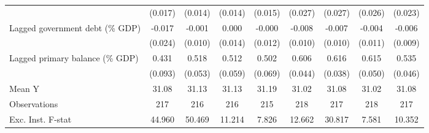 {\begin{tabular}{l*{8}{c}}
                    &     (0.017)         &     (0.014)         &     (0.014)         &     (0.015)         &     (0.027)         &     (0.027)         &     (0.026)         &     (0.023)         \\
\addlinespace
Lagged government debt (\% GDP)&      -0.017         &      -0.001         &       0.000         &      -0.000         &      -0.008         &      -0.007         &      -0.004         &      -0.006         \\
                    &     (0.024)         &     (0.010)         &     (0.014)         &     (0.012)         &     (0.010)         &     (0.010)         &     (0.011)         &     (0.009)         \\
\addlinespace
Lagged primary balance (\% GDP)&       0.431\sym{***}&       0.518\sym{***}&       0.512\sym{***}&       0.502\sym{***}&       0.606\sym{***}&       0.616\sym{***}&       0.615\sym{***}&       0.535\sym{***}\\
                    &     (0.093)         &     (0.053)         &     (0.059)         &     (0.069)         &     (0.044)         &     (0.038)         &     (0.050)         &     (0.046)         \\
\midrule
Mean Y              &       31.08         &       31.13         &       31.13         &       31.19         &       31.02         &       31.08         &       31.02         &       31.08         \\
Observations        &         217         &         216         &         216         &         215         &         218         &         217         &         218         &         217         \\
Exc. Inst. F-stat   &      44.960         &      50.469         &      11.214         &       7.826         &      12.662         &      30.817         &       7.581         &      10.352         \\
\bottomrule
\end{tabular}
}
